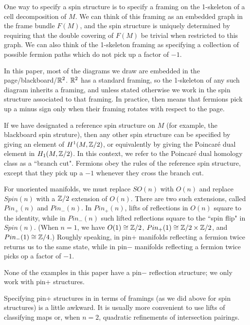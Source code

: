 One way to specify a spin structure is to specify a framing on the 1-skeleton of a cell decomposition of $M$.
We can think of this framing as an embedded graph in the frame bundle $F(M)$, and the spin structure is uniquely determined by requiring
that the double covering of $F(M)$ be trivial when restricted to this graph.
We can also think of the 1-skeleton framing as specifying a collection of possible fermion paths which do not pick up a factor of $-1$.

In this paper, most of the diagrams we draw are embedded in the page/blackboard/$\mathbb{R}^2$.
$\mathbb{R}^2$ has a standard framing, so the 1-skeleton of any such diagram inherits a framing, and unless stated otherwise we work in the spin
structure associated to that framing.
In practice, then means that fermions pick up a minus sign only when their framing rotates with respect to the page.

If we have designated a reference spin structure on $M$ (for example, the blackboard spin struture), 
then any other spin structure can be specified by giving an
element of $H^1(M, \mathbb{Z}/2)$, or equivalently by giving the Poincar\'e dual element in $H_1(M, \mathbb{Z}/2)$.
In this context, we refer to the Poincar\'e dual homology class as a ``branch cut".
Fermions obey the rules of the reference spin structure, except that they pick up a $-1$ whenever they cross the branch cut.

\medskip

For unoriented manifolds, we must replace $SO(n)$ with $O(n)$ and replace $Spin(n)$ with a $\mathbb{Z}/2$ extension of $O(n)$.
There are two such extensions, called $Pin_+(n)$ and $Pin_-(n)$.
In $Pin_+(n)$, lifts of reflections in $O(n)$ square to the identity, while in $Pin_-(n)$ such lifted reflections square to the ``spin flip"
in $Spin(n)$.
(When $n=1$, we have $O(1)\cong\mathbb{Z}/2$, $Pin_+(1)\cong\mathbb{Z}/2\times\mathbb{Z}/2$, and $Pin_-(1)\cong\mathbb{Z}/4$.)
Roughly speaking, in pin+ manifolds reflecting a fermion twice returns us to the same state, while in pin$-$ manifolds reflecting a fermion twice
picks op a factor of $-1$.

None of the examples in this paper have a pin$-$ reflection structure; we only work with pin+ structures.

Specifying pin+ structures in in terms of framings (as we did above for spin structures) is a little awkward.
It is usually more convenient to use lifts of classifying maps or, when $n=2$, quadratic refinements of intersection pairings.



